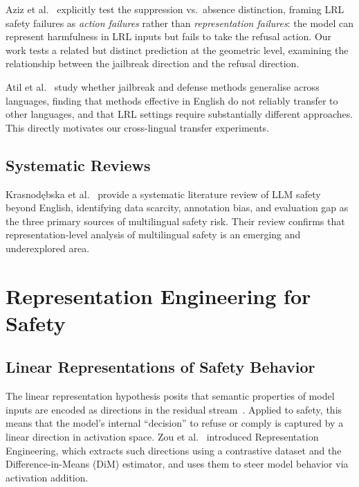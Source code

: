 Aziz et al.~\citeyearpar{aziz2026low} explicitly test the suppression vs.\ absence distinction, framing LRL safety failures as \textit{action failures} rather than \textit{representation failures}: the model can represent harmfulness in LRL inputs but fails to take the refusal action. Our work tests a related but distinct prediction at the geometric level, examining the relationship between the jailbreak direction and the refusal direction.

Atil et al.~\citeyearpar{atil2025methods} study whether jailbreak and defense methods generalise across languages, finding that methods effective in English do not reliably transfer to other languages, and that LRL settings require substantially different approaches. This directly motivates our cross-lingual transfer experiments.

\subsection{Systematic Reviews}

Krasnod\k{e}bska et al.~\citeyearpar{krasnodkebska2026safety} provide a systematic literature review of LLM safety beyond English, identifying data scarcity, annotation bias, and evaluation gap as the three primary sources of multilingual safety risk. Their review confirms that representation-level analysis of multilingual safety is an emerging and underexplored area.

\section{Representation Engineering for Safety}
\label{sec:repeng}

\subsection{Linear Representations of Safety Behavior}

The linear representation hypothesis posits that semantic properties of model inputs are encoded as directions in the residual stream~\citep{zou2023representation}. Applied to safety, this means that the model's internal ``decision'' to refuse or comply is captured by a linear direction in activation space. Zou et al.~\citeyearpar{zou2023representation} introduced Representation Engineering, which extracts such directions using a contrastive dataset and the Difference-in-Means (DiM) estimator, and uses them to steer model behavior via activation addition.

